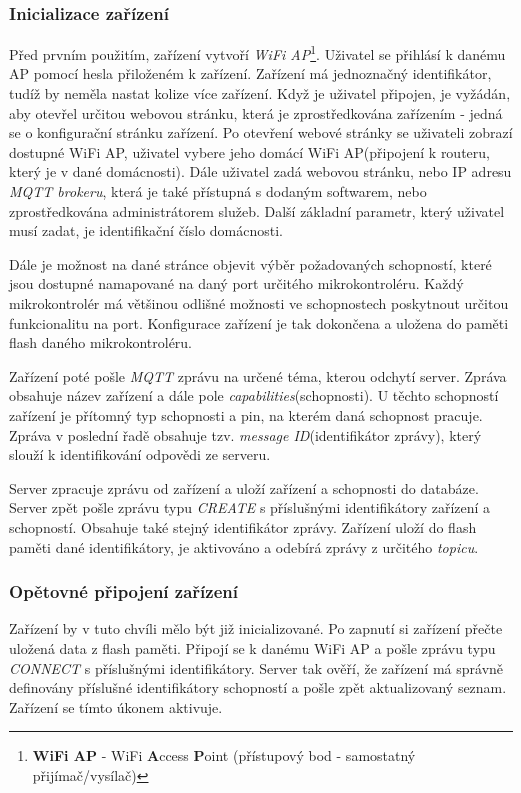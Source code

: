 \subsubsection*{Inicializace zařízení}
Před prvním použitím, zařízení vytvoří \emph{WiFi AP}\footnote{\textbf{WiFi AP} - WiFi \textbf{A}ccess \textbf{P}oint (přístupový bod - samostatný přijímač/vysílač)}.
Uživatel se přihlásí k danému AP pomocí hesla přiloženém k zařízení. Zařízení má jednoznačný identifikátor, tudíž by neměla nastat kolize více zařízení.
Když je uživatel připojen, je vyžádán, aby otevřel určitou webovou stránku, která je zprostředkována zařízením - jedná se o konfigurační stránku zařízení.
Po otevření webové stránky se uživateli zobrazí dostupné WiFi AP, uživatel vybere jeho domácí WiFi AP(připojení k routeru, který je v dané domácnosti).
Dále uživatel zadá webovou stránku, nebo IP adresu \emph{MQTT brokeru}, která je také přístupná s dodaným softwarem, nebo zprostředkována administrátorem služeb.
Další základní parametr, který uživatel musí zadat, je identifikační číslo domácnosti.

Dále je možnost na dané stránce objevit výběr požadovaných schopností, které jsou dostupné namapované na daný port určitého mikrokontroléru.
Každý mikrokontrolér má většinou odlišné možnosti ve schopnostech poskytnout určitou funkcionalitu na port.
Konfigurace zařízení je tak dokončena a uložena do paměti flash daného mikrokontroléru.

Zařízení poté pošle \emph{MQTT} zprávu na určené téma, kterou odchytí server. Zpráva obsahuje název zařízení a dále pole \emph{capabilities}(schopnosti).
U těchto schopností zařízení je přítomný typ schopnosti a pin, na kterém daná schopnost pracuje.
Zpráva v poslední řadě obsahuje tzv. \emph{message ID}(identifikátor zprávy), který slouží k identifikování odpovědi ze serveru.

Server zpracuje zprávu od zařízení a uloží zařízení a schopnosti do databáze.
Server zpět pošle zprávu typu \emph{CREATE} s příslušnými identifikátory zařízení a schopností.
Obsahuje také stejný identifikátor zprávy.
Zařízení uloží do flash paměti dané identifikátory, je aktivováno a odebírá zprávy z určitého \emph{topicu}.

\subsubsection*{Opětovné připojení zařízení}
Zařízení by v tuto chvíli mělo být již inicializované.
Po zapnutí si zařízení přečte uložená data z flash paměti.
Připojí se k danému WiFi AP a pošle zprávu typu \emph{CONNECT} s příslušnými identifikátory.
Server tak ověří, že zařízení má správně definovány příslušné identifikátory schopností a pošle zpět aktualizovaný seznam.
Zařízení se tímto úkonem aktivuje.

